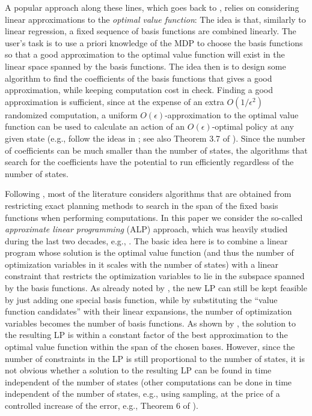 \documentclass[12pt,draftcls,onecolumn]{IEEEtran}
\begin{document}
A popular approach along these lines, which goes back to \citet{SchSei85},
relies on considering linear approximations to the \emph{optimal value function}:
The idea is that, similarly to linear regression, a fixed sequence of basis functions are combined
linearly. The user's task is to use a priori knowledge of the MDP
to choose the basis functions so that
a good approximation to the optimal value function will exist in the linear space spanned by the basis functions.
The idea then is to design some algorithm to find the coefficients of the basis functions that gives a good approximation,
while keeping computation cost in check.
Finding a good approximation is sufficient, since at the expense of an extra $O(1/\epsilon^2)$ randomized computation,
a uniform $O(\epsilon)$-approximation
to the optimal value function can be used to calculate an action of an $O(\epsilon)$-optimal policy at any given state
(e.g., follow the ideas in \cite{szepesvari2001,kearns2002sparse}; see also Theorem 3.7 of \citet{Kall17}).
Since the number of coefficients can be much smaller than the number of states, the algorithms that search
for the coefficients have the potential to run efficiently regardless of the number of states.


Following \citet{SchSei85}, most of the literature considers
algorithms that are obtained from restricting exact planning methods to search
in the span of the fixed basis functions when performing computations.
In this paper we consider the so-called \emph{approximate linear programming} (ALP) approach, which
was heavily studied during the last two decades, e.g.,
\cite{
schuurmans,
gkp,
ALP,
CS,
kveton2004heuristic,
petrik,
SALP,
fs,
npalp,
BhatFaMo12:SALPNP,
abbbama14:dualLP}.
The basic idea here is to combine a linear program whose solution is the optimal value function (and thus the number of optimization variables in it scales with the number of states) with a linear constraint that restricts the optimization variables to lie in the subspace spanned by the basis functions. As already noted by \citet{SchSei85}, the new LP can still be kept feasible by just adding one special basis function, while by substituting the ``value function candidates'' with their linear expansions, the number of optimization variables becomes the number of basis functions.
As shown by \citet{ALP}, the solution to the resulting LP is within a constant factor of the best approximation to the optimal value function within the span of the chosen bases. However, since the number of constraints in the LP is still proportional to the number of states, it is not obvious whether a solution to the resulting LP can be found in time independent of the number of states (other computations can be done in time independent of the number of states, e.g., using sampling, at the price of a controlled increase of the error, e.g., Theorem 6 of \citep{petrik}).
\end{document}
